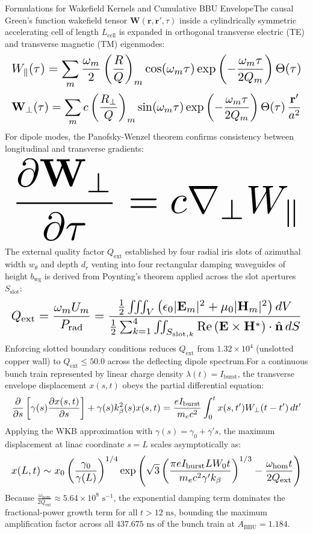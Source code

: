 Formulations for Wakefield Kernels and Cumulative BBU EnvelopeThe causal Green's function wakefield tensor $\mathbf{W}(\mathbf{r}, \mathbf{r}', \tau)$ inside a cylindrically symmetric accelerating cell of length $L_{\text{cell}}$ is expanded in orthogonal transverse electric (TE) and transverse magnetic (TM) eigenmodes:\[
\resizebox{\columnwidth}{!}{$\displaystyle W_\parallel(\tau) = \sum_{m} \frac{\omega_m}{2} \left( \frac{R}{Q} \right)_m \cos(\omega_m \tau) \exp\left( -\frac{\omega_m \tau}{2 Q_m} \right) \Theta(\tau)$}
\]
\[
\resizebox{\columnwidth}{!}{$\displaystyle \mathbf{W}_\perp(\tau) = \sum_{m} c \left( \frac{R_\perp}{Q} \right)_m \sin(\omega_m \tau) \exp\left( -\frac{\omega_m \tau}{2 Q_m} \right) \Theta(\tau) \, \frac{\mathbf{r}'}{a^2}$}
\]
For dipole modes, the Panofsky-Wenzel theorem confirms consistency between longitudinal and transverse gradients:\[
\resizebox{\columnwidth}{!}{$\displaystyle \frac{\partial \mathbf{W}_\perp}{\partial \tau} = c \nabla_\perp W_\parallel$}
\]
The external quality factor $Q_{\text{ext}}$ established by four radial iris slots of azimuthal width $w_\theta$ and depth $d_r$ venting into four rectangular damping waveguides of height $b_{\text{wg}}$ is derived from Poynting's theorem applied across the slot apertures $S_{\text{slot}}$:\[
\resizebox{\columnwidth}{!}{$\displaystyle Q_{\text{ext}} = \frac{\omega_m U_m}{P_{\text{rad}}} = \frac{\frac{1}{2} \iiint_V \left( \epsilon_0 \vert{}\mathbf{E}_m\vert{}^2 + \mu_0 \vert{}\mathbf{H}_m\vert{}^2 \right) dV}{\frac{1}{2} \sum_{k=1}^4 \iint_{S_{\text{slot}, k}} \text{Re}\left( \mathbf{E} \times \mathbf{H}^* \right) \cdot \hat{\mathbf{n}} \, dS}$}
\]
Enforcing slotted boundary conditions reduces $Q_{\text{ext}}$ from $1.32 \times 10^4$ (unslotted copper wall) to $Q_{\text{ext}} \le 50.0$ across the deflecting dipole spectrum.For a continuous bunch train represented by linear charge density $\lambda(t) = I_{\text{burst}}$, the transverse envelope displacement $x(s, t)$ obeys the partial differential equation:\[
\resizebox{\columnwidth}{!}{$\displaystyle \frac{\partial}{\partial s} \left[ \gamma(s) \frac{\partial x(s, t)}{\partial s} \right] + \gamma(s) k_\beta^2(s) x(s, t) = \frac{e I_{\text{burst}}}{m_e c^2} \int_0^t x(s, t') W_\perp(t - t') \, dt'$}
\]
Applying the WKB approximation with $\gamma(s) = \gamma_0 + \gamma' s$, the maximum displacement at linac coordinate $s = L$ scales asymptotically as:\[
\resizebox{\columnwidth}{!}{$\displaystyle x(L, t) \sim x_0 \left( \frac{\gamma_0}{\gamma(L)} \right)^{1/4} \exp\left( \sqrt{3} \left( \frac{\pi e I_{\text{burst}} L W_0 t}{m_e c^2 \gamma' k_\beta} \right)^{1/3} - \frac{\omega_{\text{hom}} t}{2 Q_{\text{ext}}} \right)$}
\]
Because $\frac{\omega_{\text{hom}}}{2 Q_{\text{ext}}} \approx 5.64 \times 10^8\text{ s}^{-1}$, the exponential damping term dominates the fractional-power growth term for all $t > 12\text{ ns}$, bounding the maximum amplification factor across all $437.675\text{ ns}$ of the bunch train at $A_{\text{BBU}} = 1.184$.